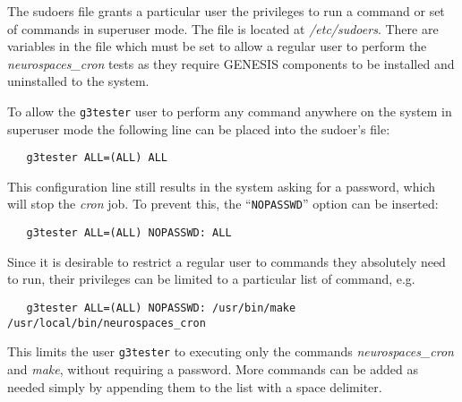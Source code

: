 \documentclass[12pt]{article}
\begin{document}
The sudoers file grants a particular user the privileges to run a command or set of commands in superuser mode. The file is located at {\it /etc/sudoers}. There are variables in the file which must be set to allow a regular user to perform the {\it neurospaces\_cron} tests as they require GENESIS components to be installed and uninstalled to the system.

To allow the {\tt g3tester} user to perform any command anywhere on the system in superuser mode the following line can be placed into the sudoer's file:
\begin{verbatim}
   g3tester ALL=(ALL) ALL
\end{verbatim}
This configuration line still results in the system asking for a password, which will stop the {\it cron} job. To prevent this, the ``{\tt NOPASSWD}'' option can be inserted:
\begin{verbatim}
   g3tester ALL=(ALL) NOPASSWD: ALL
\end{verbatim}
Since it is desirable to restrict a regular user to commands they absolutely need to run, their privileges can be limited to a particular list of command, e.g.
\begin{verbatim}
   g3tester ALL=(ALL) NOPASSWD: /usr/bin/make /usr/local/bin/neurospaces_cron
\end{verbatim}
This limits the user {\tt g3tester} to executing only the commands {\it neurospaces\_cron} and {\it make}, without requiring a password. More commands can be added as needed simply by appending them to the list with a space delimiter. 
\end{document}

